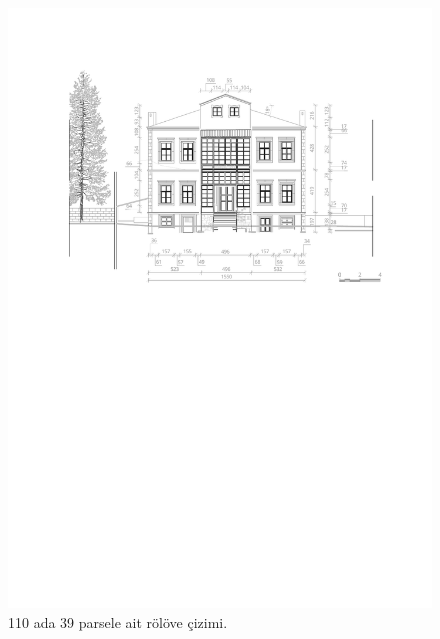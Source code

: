\begin{figure}
\centering
\includegraphics[width=1\textwidth,height=\textheight]{source/figures/Roloveler/R110-39.pdf}
\caption{110 ada 39 parsele ait rölöve çizimi.}
\end{figure}

